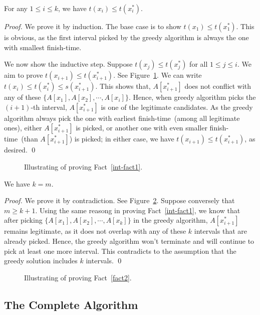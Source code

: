 \begin{fact} \label{int-fact1}
For any $1 \le i \le k$, we have $t(x_i) \le t(x_i^*)$.
\end{fact}

\emph{Proof.} We prove it by induction. The base case
is to show $t(x_1) \le t(x_1^*)$. This is obvious,
as the first interval picked by the greedy algorithm 
is always the one with smallest finish-time.

We now show the inductive step. Suppose $t(x_j) \le t(x_j^*)$ for all $1\le j \le i$.
We aim to prove $t(x_{i+1}) \le t(x_{i+1}^*)$. See Figure~\ref{fig:inductive}.
We can write $t(x_i) \le t(x_i^*) \le s(x_{i+1}^*)$. 
This shows that, $A[x^*_{i+1}]$ does not conflict with 
any of these $\{A[x_1], A[x_2], \cdots, A[x_i]\}$.
Hence, when greedy algorithm picks the $(i+1)$-th interval, 
$A[x^*_{i+1}]$ is one of the legitimate candidates.
As the greedy algorithm always pick the one with earliest finish-time~(among all legitimate ones), 
either $A[x^*_{i+1}]$ is picked, or another one with even smaller finish-time~(than $A[x^*_{i+1}]$) is picked;
in either case, we have $t(x_{i+1}) \le t(x_{i+1}^*)$, as desired. \qed

\begin{figure}[h]
\centering{}
\caption{Illustrating of proving Fact~\ref{int-fact1}.}
\label{fig:inductive}
\end{figure}

\begin{fact} \label{fact2}
We have $k = m$.
\end{fact}

\emph{Proof.} We prove it by contradiction.
See Figure~\ref{fig:fact2}.  Suppose conversely that $m \ge k + 1$.
Using the same reasong in proving Fact~\ref{int-fact1},
we know that after picking $\{A[x_1], A[x_2], \cdots, A[x_k]\}$ in the greedy algorithm,
$A[x^*_{i+1}]$ remains legitimate, as it does not overlap with any of these $k$ intervals that are already picked.
Hence, the greedy algorithm won't terminate and will continue to pick at least one more interval.
This contradicts to the assumption that the greedy solution includes $k$ intervals. \qed

\begin{figure}[h]
\centering{}
\caption{Illustrating of proving Fact~\ref{fact2}.}
\label{fig:fact2}
\end{figure}


\subsection*{The Complete Algorithm}

